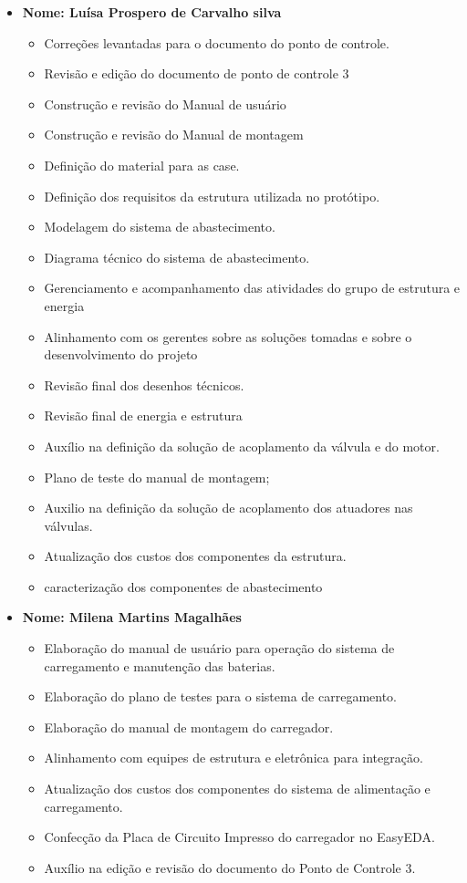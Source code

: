 \begin{itemize}
    \item \textbf{Nome: Luísa Prospero de Carvalho silva}
    \begin{itemize} 
     \item Correções levantadas para o documento do ponto de controle.
     \item Revisão e edição do documento de ponto de controle 3
     \item Construção e revisão do Manual de usuário
     \item Construção e revisão do Manual de montagem 
     \item Definição do material para as case.
     \item Definição dos requisitos da estrutura utilizada no protótipo.
     \item Modelagem do sistema de abastecimento. 
     \item Diagrama técnico do sistema de abastecimento.
     \item Gerenciamento e acompanhamento das atividades do grupo de estrutura e energia 
     \item Alinhamento com os gerentes sobre as soluções tomadas e sobre o desenvolvimento do projeto
     \item Revisão final dos desenhos técnicos.
     \item Revisão final de energia e estrutura
     \item Auxílio na definição da solução de acoplamento da válvula e do motor.
     \item Plano de teste do manual de montagem;
     \item Auxilio na definição da solução de acoplamento dos atuadores nas válvulas.
     \item Atualização dos custos dos componentes da estrutura.
     \item caracterização dos componentes de abastecimento
   \end{itemize}
    
    \item \textbf{Nome: Milena Martins Magalhães}
    \begin{itemize}
    \item Elaboração do manual de usuário para operação do sistema de carregamento e  manutenção das baterias.
    \item Elaboração do plano de testes para o sistema de carregamento.
    \item Elaboração do manual de montagem do carregador.
    \item Alinhamento com equipes de estrutura e eletrônica para integração.
    \item Atualização dos custos dos componentes do sistema de alimentação e carregamento.
    \item Confecção da Placa de Circuito Impresso do carregador no EasyEDA.
    \item Auxílio na edição e revisão do documento do Ponto de Controle 3.
    \end{itemize}
    

\end{itemize}
